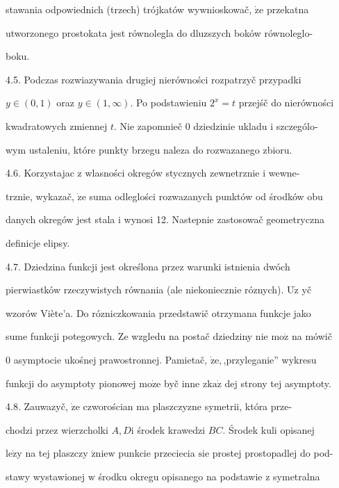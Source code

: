 \documentclass[a4paper,12pt]{article}
\begin{document}
stawania odpowiednich (trzech) trójkatów wywnioskowač, $\dot{\mathrm{z}}\mathrm{e}$ przekatna

utworzonego prostokata jest równolegla do dluzszych boków równoleglo-

boku.

4.5. Podczas rozwiazywania drugiej nierówności rozpatrzyč przypadki

$ y\in (0,1)$ oraz $ y\in (1,\infty)$. Po podstawieniu $2^{x}=t$ przejśč do nierówności

kwadratowych zmiennej $t$. Nie zapomnieč $0$ dziedzinie ukladu $\mathrm{i}$ szczególo-

wym ustaleniu, które punkty brzegu naleza do rozwazanego zbioru.

4.6. Korzystajac $\mathrm{z}$ wlasności okregów stycznych zewnetrznie $\mathrm{i}$ wewne-

trznie, wykazač, $\dot{\mathrm{z}}\mathrm{e}$ suma odleglości rozwazanych punktów od środków obu

danych okregów jest stala $\mathrm{i}$ wynosi 12. Nastepnie zastosowač geometryczna

definicje elipsy.

4.7. Dziedzina funkcji jest określona przez warunki istnienia dwóch

pierwiastków rzeczywistych równania (ale niekoniecznie róznych). $\mathrm{U}\dot{\mathrm{z}}$ yč

wzorów Viète'a. Do rózniczkowania przedstawič otrzymana funkcje jako

sume funkcji potegowych. Ze wzgledu na postač dziedziny nie $\mathrm{m}\mathrm{o}\dot{\mathrm{z}}$ na mówič

$0$ asymptocie ukośnej prawostronnej. Pamietač, $\dot{\mathrm{z}}\mathrm{e},$,przyleganie'' wykresu

funkcji do asymptoty pionowej $\mathrm{m}\mathrm{o}\dot{\mathrm{z}}\mathrm{e}$ byč inne $\mathrm{z}\mathrm{k}\mathrm{a}\dot{\mathrm{z}}$ dej strony tej asymptoty.

4.8. Zauwazyč, $\dot{\mathrm{z}}\mathrm{e}$ czworościan ma plaszczyzne symetrii, która prze-

chodzi przez wierzcholki $A, D\mathrm{i}$ środek krawedzi $BC$. Środek kuli opisanej

$\mathrm{l}\mathrm{e}\dot{\mathrm{z}}\mathrm{y}$ na tej plaszczy $\acute{\mathrm{z}}\mathrm{n}\mathrm{i}\mathrm{e}\mathrm{w}$ punkcie przeciecia $\mathrm{s}\mathrm{i}\mathrm{e}$ prostej prostopadlej do pod-

stawy wystawionej $\mathrm{w}$ środku okregu opisanego na podstawie $\mathrm{z}$ symetralna
\end{document}
